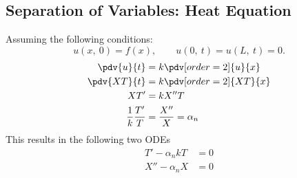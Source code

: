 \documentclass{article}
\begin{document}
\subsection{Separation of Variables: Heat Equation}
Assuming the following conditions:
\begin{equation*}
    u\left( x,\: 0 \right) = f\left( x \right), \quad\quad u\left( 0,\: t \right) = u\left( L,\: t \right) = 0.
\end{equation*}
\begin{align*}
    \pdv{u}{t}               & = k\pdv[order=2]{u}{x}     \\
    \pdv{XT}{t}              & = k\pdv[order=2]{XT}{x}    \\
    XT'                      & = kX''T                    \\
    \frac{1}{k} \frac{T'}{T} & = \frac{X''}{X} = \alpha_n
\end{align*}
This results in the following two ODEs
\begin{align*}
    T' - \alpha_n k T & = 0 \\
    X'' - \alpha_n X  & = 0
\end{align*}
\end{document}
